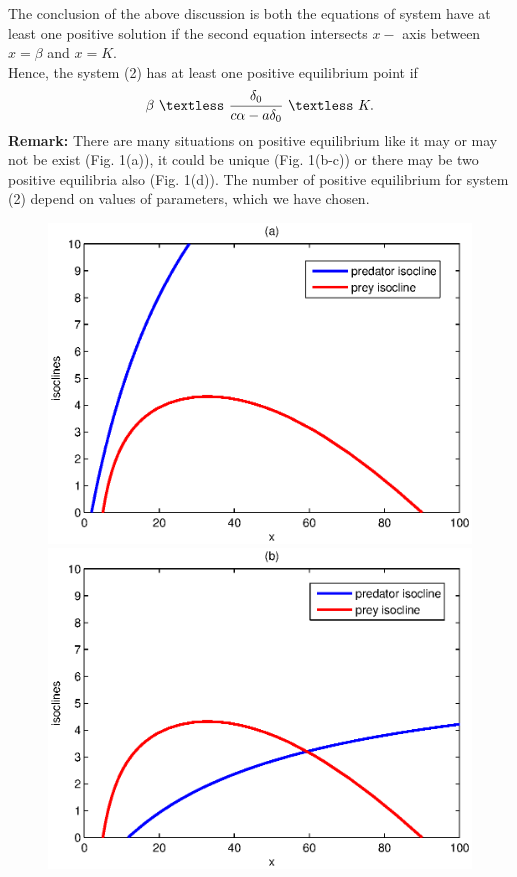 \documentclass[a4paper, 10pt]{article}
\begin{document}
The conclusion of the above discussion is both the equations of system have at least one positive solution if the second equation intersects $x-$ axis between $x=\beta$ and $x=K.$\\
	Hence, the system (2) has at least one positive equilibrium point if
	\[\beta~ \textless ~\frac{\delta_0}{c\alpha-a\delta_0}~ \textless~ K.\]
	\textbf{Remark:} There are many situations on positive equilibrium like it may or may not be exist (Fig. 1(a)), it could be unique (Fig. 1(b-c)) or there may be two positive equilibria also (Fig. 1(d)). The number of positive equilibrium for system (2) depend on values of parameters, which we have chosen. 	
	\begin{figure}[H]
		{\includegraphics[scale=.6]{2.eps}}
		\endminipage\hfill
		{\includegraphics[scale=.6]{3.eps}}

\end{figure}
\end{document}
